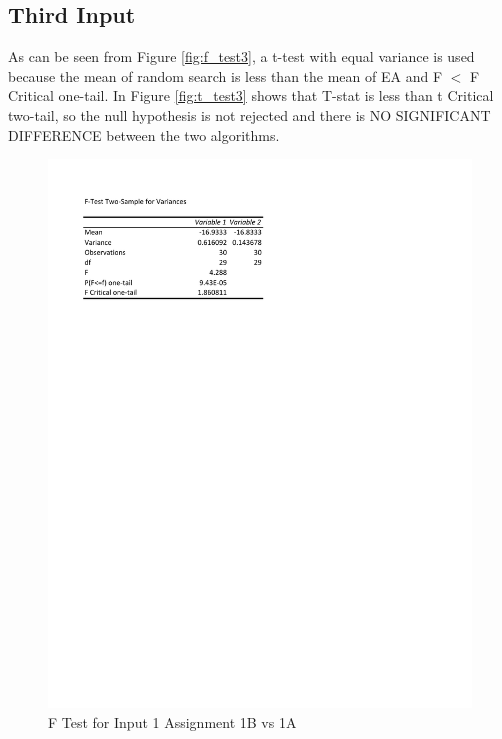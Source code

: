 \documentclass[times]{article}
\begin{document}
	\subsection{Third Input}
	As can be seen from Figure \ref{fig:f_test3}, a t-test with equal variance is used because the mean of random search is less than the mean of EA and F $<$ F Critical one-tail. In Figure \ref{fig:t_test3} shows that T-stat is less than t Critical two-tail, so the null hypothesis is not rejected and there is NO SIGNIFICANT DIFFERENCE between the two algorithms.


	\begin{figure}
		\caption{F Test for Input 1 Assignment 1B vs 1A}
		\label{fig:f_test1}
		\includegraphics[width=\textwidth]{./tests/Input1_f_test.pdf}
	\end{figure}
\end{document}
